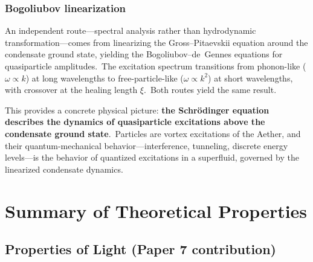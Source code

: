 ﻿\documentclass[12pt,letterpaper]{article}
\begin{document}
\subsubsection*{Bogoliubov linearization}

An independent route---spectral analysis rather than hydrodynamic
transformation---comes from linearizing the Gross--Pitaevskii equation
around the condensate ground state, yielding the Bogoliubov--de~Gennes
equations \cite{bogoliubov1947} for quasiparticle amplitudes.\ The
excitation spectrum transitions from phonon-like ($\omega \propto k$) at
long wavelengths to free-particle-like ($\omega \propto k^2$) at short
wavelengths, with crossover at the healing length $\xi$.\ Both routes
yield the same result.

This provides a concrete physical picture: \textbf{the Schr\"{o}dinger equation describes
the dynamics of quasiparticle excitations above the condensate ground state}.\ Particles
are vortex excitations of the Aether, and their quantum-mechanical behavior---interference,
tunneling, discrete energy levels---is the behavior of quantized excitations in a superfluid,
governed by the linearized condensate dynamics.



\section{Summary of Theoretical Properties}

\subsection{Properties of Light (Paper 7 contribution)}
\end{document}
